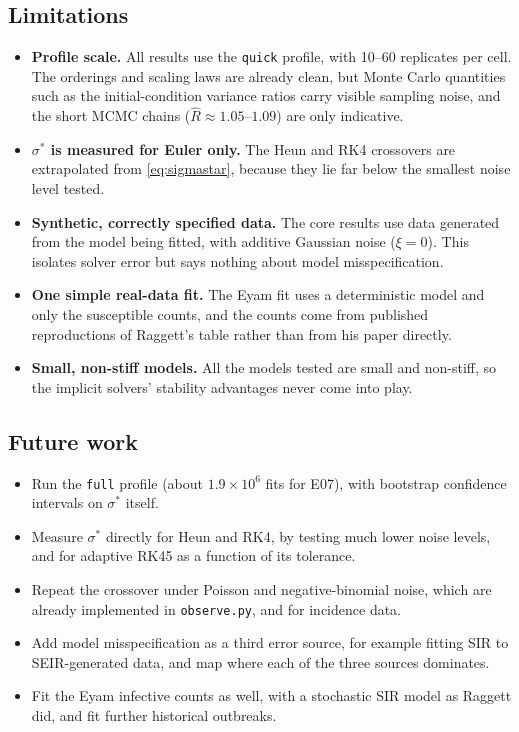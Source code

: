 \documentclass[sigconf]{acmart}
\begin{document}
\subsection{Limitations}
\begin{itemize}
  \item \textbf{Profile scale.} All results use the \texttt{quick}
    profile, with 10--60 replicates per cell. The orderings and scaling
    laws are already clean, but Monte Carlo quantities such as the
    initial-condition variance ratios carry visible sampling noise, and
    the short MCMC chains ($\hat R\approx1.05$--$1.09$) are only
    indicative.
  \item \textbf{$\sigma^*$ is measured for Euler only.} The Heun and RK4
    crossovers are extrapolated from \eqref{eq:sigmastar}, because they
    lie far below the smallest noise level tested.
  \item \textbf{Synthetic, correctly specified data.} The core results
    use data generated from the model being fitted, with additive
    Gaussian noise ($\xi=0$). This isolates solver error but says
    nothing about model misspecification.
  \item \textbf{One simple real-data fit.} The Eyam fit uses a
    deterministic model and only the susceptible counts, and the counts
    come from published reproductions of Raggett's table rather than
    from his paper directly.
  \item \textbf{Small, non-stiff models.} All the models tested are
    small and non-stiff, so the implicit solvers' stability advantages
    never come into play.
\end{itemize}

\subsection{Future work}
\begin{itemize}
  \item Run the \texttt{full} profile (about $1.9\times10^6$ fits for
    E07), with bootstrap confidence intervals on $\sigma^*$ itself.
  \item Measure $\sigma^*$ directly for Heun and RK4, by testing much
    lower noise levels, and for adaptive RK45 as a function of its
    tolerance.
  \item Repeat the crossover under Poisson and negative-binomial noise,
    which are already implemented in \texttt{observe.py}, and for
    incidence data.
  \item Add model misspecification as a third error source, for example
    fitting SIR to SEIR-generated data, and map where each of the three
    sources dominates.
  \item Fit the Eyam infective counts as well, with a stochastic SIR
    model as Raggett did, and fit further historical outbreaks.
\end{itemize}



\end{document}
